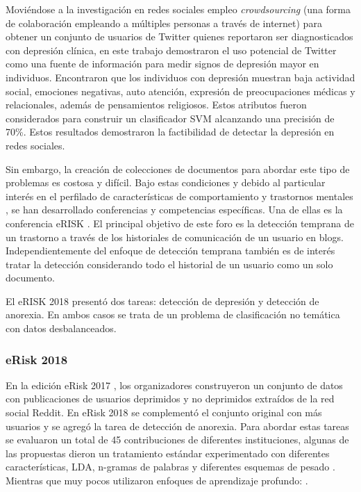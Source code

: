 Moviéndose a la investigación en redes sociales \citep{de2013predicting} empleo \textit{crowdsourcing} (una forma de colaboración empleando a múltiples personas a través de internet) para obtener un conjunto de usuarios de Twitter quienes reportaron ser diagnosticados con depresión clínica, en este trabajo demostraron el uso potencial de Twitter como una fuente de información para medir signos de depresión mayor en individuos. Encontraron que los individuos con depresión muestran baja actividad social, emociones negativas, auto atención, expresión de preocupaciones médicas y relacionales, además de pensamientos religiosos. Estos atributos fueron considerados para construir un clasificador SVM alcanzando una precisión de 70\%. Estos resultados demostraron la factibilidad de detectar la depresión en redes sociales. 

Sin embargo, la creación de colecciones de documentos para abordar este tipo de problemas es costosa y difícil. Bajo estas condiciones y debido al particular interés en el perfilado de características de comportamiento \citep{kumar2018aggression} y trastornos mentales  \citep{de2013predicting}, se han desarrollado conferencias y competencias específicas.
Una de ellas es la conferencia eRISK \citep{Losada2018}. El principal objetivo de este foro es la detección temprana de un trastorno a través de los historiales de comunicación de un usuario en blogs. Independientemente del enfoque de detección temprana también es de interés tratar la detección
considerando todo el historial de un usuario como un solo documento. 

El eRISK 2018 presentó dos tareas: detección de depresión y detección de anorexia. En ambos casos se trata de un problema de clasificación no temática con datos desbalanceados.


\subsubsection{eRisk 2018}

En la edición eRisk 2017 \citep{losada2017erisk, Losada2018}, los organizadores construyeron un conjunto de datos con publicaciones de usuarios deprimidos y no deprimidos extraídos de la red social Reddit. En eRisk 2018 se complementó el conjunto original con más usuarios y se agregó la tarea de detección de anorexia. Para abordar estas tareas se evaluaron un total de 45 contribuciones de diferentes instituciones, algunas de las propuestas dieron un tratamiento estándar experimentado con diferentes características, LDA, n-gramas de palabras y diferentes esquemas de pesado \citep{cacheda2018analysis, almeida2017detecting, ortega2018peimex}. Mientras que muy pocos utilizaron enfoques de aprendizaje profundo: \citep{trotzek2018word, wang2018neural, liu2018tua1}.

